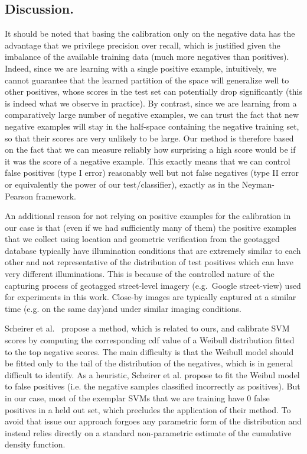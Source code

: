    \subsection{Discussion.}
      It should be noted that basing the calibration only on the negative data has the advantage that we privilege precision over recall, which is justified given the imbalance of the available training data (much more negatives than positives).
      Indeed, since we are learning with a single positive example, intuitively, we cannot guarantee that the learned partition of the space will generalize well to other positives, whose scores in the test set can potentially drop significantly (this is indeed what we observe in practice). By contrast, since we are learning from a comparatively large number of negative examples, we can trust the fact that new negative examples will stay in the half-space containing the negative training set, so that their scores are very unlikely to be large. Our method is therefore based on the fact that we can measure reliably how surprising a high score would be if it was the score of a negative example. This exactly means that we can control false positives (type I error) reasonably well but not false negatives (type II error or equivalently the power of our test/classifier), exactly as in the Neyman-Pearson framework.

      An additional reason for not relying on positive examples for the calibration in our case is that (even if we had sufficiently many of them) the positive examples that we collect using location and geometric verification from the geotagged database typically have illumination conditions that are extremely similar to each other and not representative of the distribution of test positives which can have very different illuminations. This is because of the controlled nature of the capturing process of geotagged street-level imagery (e.g.\ Google street-view) used for experiments in this work. Close-by images are typically captured at a similar time (e.g. on the same day)and under similar imaging conditions.

      Scheirer et al.~\cite{Scheirer12} propose a method, which is related to ours, and calibrate SVM scores by computing the corresponding cdf value of a Weibull distribution fitted to the top negative scores. The main difficulty is that the Weibull model should be fitted only to the tail of the distribution of the negatives, which is in general difficult to identify. As a heuristic, Scheirer et al. propose to fit the Weibul model to false positives (i.e. the negative samples classified incorrectly as positives). But in our case, most of the exemplar SVMs that we are training have $0$ false positives in a held out set, which precludes the application of their method. To avoid that issue our approach forgoes any parametric form of the distribution and instead relies directly on a standard non-parametric estimate of the cumulative density function.

